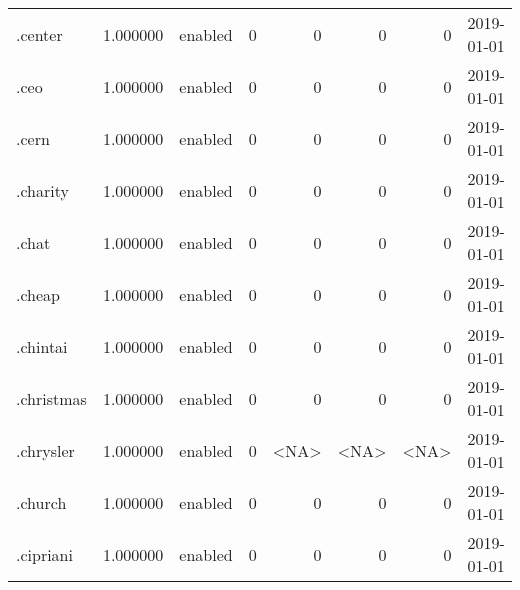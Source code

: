 \begin{tabular}{lrlrrrrl}
.center                   &          1.000000 &         enabled &                           0 &                           0 &                           0 &                   0 &           2019-01-01 \\
.ceo                      &          1.000000 &         enabled &                           0 &                           0 &                           0 &                   0 &           2019-01-01 \\
.cern                     &          1.000000 &         enabled &                           0 &                           0 &                           0 &                   0 &           2019-01-01 \\
.charity                  &          1.000000 &         enabled &                           0 &                           0 &                           0 &                   0 &           2019-01-01 \\
.chat                     &          1.000000 &         enabled &                           0 &                           0 &                           0 &                   0 &           2019-01-01 \\
.cheap                    &          1.000000 &         enabled &                           0 &                           0 &                           0 &                   0 &           2019-01-01 \\
.chintai                  &          1.000000 &         enabled &                           0 &                           0 &                           0 &                   0 &           2019-01-01 \\
.christmas                &          1.000000 &         enabled &                           0 &                           0 &                           0 &                   0 &           2019-01-01 \\
.chrysler                 &          1.000000 &         enabled &                           0 &                        <NA> &                        <NA> &                <NA> &           2019-01-01 \\
.church                   &          1.000000 &         enabled &                           0 &                           0 &                           0 &                   0 &           2019-01-01 \\
.cipriani                 &          1.000000 &         enabled &                           0 &                           0 &                           0 &                   0 &           2019-01-01 \\

\end{tabular}
